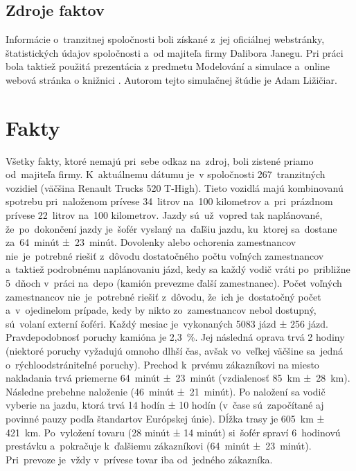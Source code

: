 \documentclass[a4paper, 11pt]{article}
\begin{document}
    \subsection{Zdroje faktov}
	Informácie o~tranzitnej spoločnosti boli získané z~jej oficiálnej
    webstránky\cite{DaliTrans}, štatistických údajov
    spoločnosti\cite{DaliTransFinstat} a~od
    majiteľa firmy Dalibora Janegu.
    Pri práci bola taktiež použitá prezentácia z predmetu
    Modelování a simulace\cite{IMSprezentácia}
    a~online webová stránka o knižnici \cite{SIMLIB}.\newline
    Autorom tejto simulačnej štúdie je Adam Ližičiar.\newline

    \newpage
	\section{Fakty}
    Všetky fakty, ktoré nemajú pri~sebe odkaz na~zdroj, boli zistené priamo
    od~majiteľa firmy.\newline
    \newline
    K~aktuálnemu dátumu je~v spoločnosti
    267~tranzitných vozidiel (väčšina Renault Trucks
    520 T-High). Tieto vozidlá majú kombinovanú spotrebu pri~naloženom prívese
    34~litrov na~100 kilometrov a~pri~prázdnom prívese 22~litrov
    na~100 kilometrov.\cite{RenualtTrucks}\newline
    Jazdy sú~už~vopred tak naplánované, že~po~dokončení jazdy je~šofér
    vyslaný na~ďaľšiu jazdu, ku~ktorej sa~dostane
    za~64~minút ±~23~minút.
    Dovolenky alebo ochorenia zamestnancov nie~je~potrebné riešiť
    z~dôvodu dostatočného počtu voľných zamestnancov a~taktiež
    podrobnému naplánovaniu jázd, kedy sa každý vodič vráti po~približne
    5~dňoch v~práci na~depo (kamión prevezme ďalší zamestnanec). Počet
    voľných zamestnancov nie~je~potrebné riešiť z~dôvodu, že~ich 
    je~dostatočný počet a~v~ojedinelom prípade, kedy by nikto zo~zamestnancov
    nebol dostupný, sú~volaní externí šoféri. Každý mesiac
    je~vykonaných 5083 jázd  ± 256 jázd. Pravdepodobnosť poruchy
    kamióna je 2,3~\%. Jej následná oprava trvá 2 hodiny 
    (niektoré poruchy vyžadujú omnoho dlhší čas, avšak vo~veľkej väčšine
    sa~jedná o~rýchloodstrániteľné poruchy).\newline
    Prechod k~prvému zákazníkovi na miesto nakladania trvá priemerne 
    64~minút ±~23~minút (vzdialenosť 85~km ±~28~km). Následne prebehne naloženie (46~minút ±~21~minút).
    Po naložení sa vodič vyberie na jazdu, ktorá trvá 14 hodín ± 10 hodín
    (v~čase sú~započítané aj povinné pauzy podľa štandartov Európskej
    únie). Dĺžka trasy je 605~km  ± 421~km.
    Po~vyložení tovaru (28 minút ± 14 minút) si~šofér spraví 6~hodinovú prestávku
    a~pokračuje k~ďalšiemu zákazníkovi (64~minút ±~23~minút). Pri~prevoze je~vždy v~prívese
    tovar iba od~jedného zákazníka.\cite{DaliTrans}\newline
\end{document}
